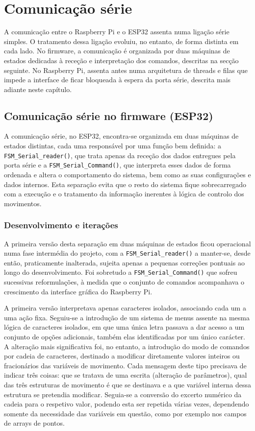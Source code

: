 \section{Comunicação série}
A comunicação entre o Raspberry Pi e o ESP32 assenta numa ligação série simples. O tratamento dessa ligação evoluiu, no entanto, de forma distinta em cada lado. No firmware, a comunicação é organizada por duas máquinas de estados dedicadas à receção e interpretação dos comandos, descritas na secção seguinte. No Raspberry Pi, assenta antes numa arquitetura de threads e filas que impede a interface de ficar bloqueada à espera da porta série, descrita mais adiante neste capítulo.

\subsection{Comunicação série no firmware (ESP32)}
A comunicação série, no ESP32, encontra-se organizada em duas máquinas de estados distintas, cada uma responsável por uma função bem definida: a \texttt{FSM\_Serial\_reader()}, que trata apenas da receção dos dados entregues pela porta série e a \texttt{FSM\_Serial\_Command()}, que interpreta esses dados de forma ordenada e altera o comportamento do sistema, bem como as suas configurações e dados internos. Esta separação evita que o resto do sistema fique sobrecarregado com a execução e o tratamento da informação inerentes à lógica de controlo dos movimentos.

\subsubsection{Desenvolvimento e iterações}
A primeira versão desta separação em duas máquinas de estados ficou operacional numa fase intermédia do projeto, com a \texttt{FSM\_Serial\_reader()} a manter-se, desde então, praticamente inalterada, sujeita apenas a pequenas correções pontuais ao longo do desenvolvimento. Foi sobretudo a \texttt{FSM\_Serial\_Command()} que sofreu sucessivas reformulações, à medida que o conjunto de comandos acompanhava o crescimento da interface gráfica do Raspberry Pi.

A primeira versão interpretava apenas caracteres isolados, associando cada um a uma ação fixa. Seguiu-se a introdução de um sistema de menus assente na mesma lógica de caracteres isolados, em que uma única letra passava a dar acesso a um conjunto de opções adicionais, também elas identificadas por um único carácter. A alteração mais significativa foi, no entanto, a introdução do modo de comandos por cadeia de caracteres, destinado a modificar diretamente valores inteiros ou fracionários das variáveis de movimento. Cada mensagem deste tipo precisava de indicar três coisas: que se tratava de uma escrita (alteração de parâmetros), qual das três estruturas de movimento é que se destinava e a que variável interna dessa estrutura se pretendia modificar. Seguia-se a conversão do excerto numérico da cadeia para o respetivo valor, podendo esta ser repetida várias vezes, dependendo somente da necessidade das variáveis em questão, como por exemplo nos campos de arrays de pontos.

